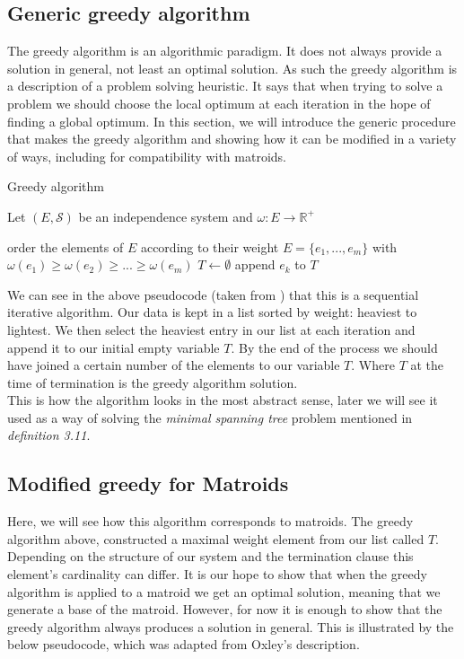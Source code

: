\documentclass[../main.tex]{subfiles}
\begin{document}
\subsection{Generic greedy algorithm}
The greedy algorithm is an algorithmic paradigm. It does not always provide a solution in general, not least an optimal solution. As such the greedy algorithm is a description of a problem solving heuristic.  It says that when trying to solve a problem we should choose the local optimum at each iteration in the hope of finding a global optimum. In this section, we will introduce the generic procedure that makes the greedy algorithm and showing how it can be modified in a variety of ways, including for compatibility with matroids.

\begin{algorithm}[H]
\caption{Greedy algorithm\cite{jungnickel}}\label{greedy}
Let $(E,\mathcal{S})$ be an independence system and $\omega:E \longrightarrow \mathbb{R^+}$
\begin{algorithmic}[1]
\State order the elements of $E$ according to their weight
\State $E = \{ e_1,...,e_m\}$ with $\omega(e_1) \geq \omega(e_2) \geq ... \geq \omega(e_m)$
\State $T\gets \emptyset$
	 	\State append $e_k$ to $T$
	\EndIf
\EndFor
\EndProcedure
\end{algorithmic}
\end{algorithm}

We can see in the above pseudocode (taken from \cite{jungnickel}) that this is a sequential iterative algorithm. Our data is kept in a list sorted by weight: heaviest to lightest. We then select the heaviest entry in our list at each iteration and append it to our initial empty variable $T.$ By the end of the process we should have joined a certain number of the elements to our variable $T.$ Where $T$ at the time of termination is the greedy algorithm solution.\\ This is how the algorithm looks in the most abstract sense, later we will see it used as a way of solving the \textit{minimal spanning tree} problem mentioned in \textit{definition 3.11}.
\subsection{Modified greedy for Matroids}
Here, we will see how this algorithm corresponds to matroids. The greedy algorithm above, constructed a maximal weight element from our list called $T.$ Depending on the structure of our system and the termination clause this element's cardinality can differ. It is our hope to show that when the greedy algorithm is applied to a matroid we get an optimal solution, meaning that we generate a base of the matroid. However, for now it is enough to show that the greedy algorithm always produces a solution in general. This is illustrated by the below pseudocode, which was adapted from Oxley's\cite{ox_book} description.
\end{document}
